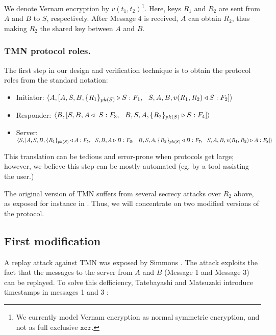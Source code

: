 \documentclass{entcs} \usepackage{entcsmacro}
\begin{document}
We denote Vernam
encryption by $v(t_1,t_2)$\footnote{We currently model Vernam
encryption as normal symmetric encryption, and not as full exclusive
$\mathtt{xor}$.}.
Here, keys $R_1$ and $R_2$ are sent from $A$ and $B$ to $S$,
respectively. After Message 4 is received, $A$ can obtain $R_2$, thus
making $R_2$ the shared key between $A$ and $B$.

\subsubsection{TMN protocol roles.}
The first step in our design and verification technique is to obtain
the protocol roles from the standard notation:
\begin{itemize}
\item Initiator: 
$\langle A, [ A,S,B, \{\emph{R}_1\}_{pk(S)} \triangleright S : F_1, \ \ 
S,A,B,v(\emph{R}_1,\emph{R}_2) \triangleleft S:F_2 ] \rangle$

\item Responder: 
$\langle B, [ S,B,A \triangleleft \ S:F_3, \ \ 
B,S,A, \{\emph{R}_2\}_{pk(S)} \triangleright S: F_4 ] \rangle$

\item Server: 
$\langle S, [ A,S,B, \{\emph{R}_1\}_{pk(S)} \triangleleft A : F_5, \ \ 
S,B,A \triangleright B : F_6, \ \ B,S,A, \{\emph{R}_2\}_{pk(S)} 
\triangleleft B: F_7, \ \ 
S,A,B, v(\emph{R}_1,\emph{R}_2) \triangleright A: F_8 ] 
\rangle$
\end{itemize}

This translation can be tedious and error-prone when protocols get
large; however, we believe this step can be mostly automated (eg. by a
tool assisting the user.)

The original version of TMN suffers from several secrecy attacks over
$R_2$ above, as exposed for instance in \cite{LR97}. Thus, we will concentrate on two modified versions of the protocol.

\subsection{First modification} A
replay attack against TMN was exposed by Simmons \cite{SIM94}. The
attack exploits the fact that the messages to the server from $A$ and
$B$ (Message 1 and Message 3) can be replayed.  To solve this
defficiency, Tatebayashi and Matsuzaki introduce timestamps
in messages 1 and 3 \cite{tmn90}:\\
\end{document}
